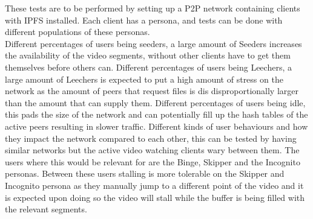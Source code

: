 These tests are to be performed by setting up a \ac{P2P} network containing clients with \ac{IPFS} installed. Each client has a persona, and tests can be done with different populations of these personas.\\
%
%
Different percentages of users being seeders, a large amount of Seeders increases the availability of the video segments, without other clients have to get them themselves before others can.
Different percentages of users being Leechers, a large amount of Leechers is expected to put a high amount of stress on the network as the amount of peers that request files is dis disproportionally larger than the amount that can supply them.
Different percentages of users being idle, this pads the size of the network and can potentially fill up the hash tables of the active peers resulting in slower traffic.
Different kinds of user behaviours and how they impact the network compared to each other, this can be tested by having similar networks but the active video watching clients wary between them. The users where this would be relevant for are the Binge, Skipper and the Incognito personas. Between these users stalling is more tolerable on the Skipper and Incognito persona as they manually jump to a different point of the video and it is expected upon doing so the video will stall while the buffer is being filled with the relevant segments.
